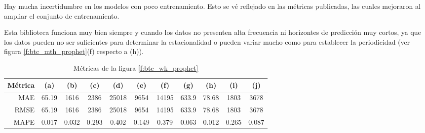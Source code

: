 \documentclass[a4paper,10pt]{article}
\begin{document}
Hay mucha incertidumbre en los modelos con poco entrenamiento. Esto se vé reflejado en las métricas publicadas, las cuales mejoraron al ampliar el conjunto de entrenamiento.

Esta biblioteca funciona muy bien siempre y cuando los datos no presenten alta frecuencia ni horizontes de predicción muy cortos, ya que los datos pueden no ser suficientes para
determinar la estacionalidad o pueden variar mucho como para establecer la periodicidad (ver figura \ref{f:btc_mth_prophet}(f) respecto a (h)).

\begin{table}[H]
 \begin{center}
 \resizebox{12cm}{!} {
  \begin{tabular}{|r|c|c|c|c|c|c|c|c|c|c|}
    Métrica & (a) & (b) & (c) & (d) & (e) & (f) & (g) & (h) & (i) & (j) \\ \hline
    MAE & 65.19 & 1616 & 2386 & 25018 & 9654 & 14195 & 633.9 & 78.68 & 1803 & 3678 \\
    RMSE & 65.19 & 1616 & 2386 & 25018 & 9654 & 14195 & 633.9 & 78.68 & 1803 & 3678 \\
    MAPE & 0.017 & 0.032 & 0.293 & 0.402 & 0.149 & 0.379 & 0.063 & 0.012 & 0.265 & 0.087 \\ \hline
  \end{tabular}
  }
  \caption{Métricas de la figura \ref{f:btc_wk_prophet}}
  \label{tab:btc_prophet_wk}
 \end{center}
\end{table}
\end{document}
